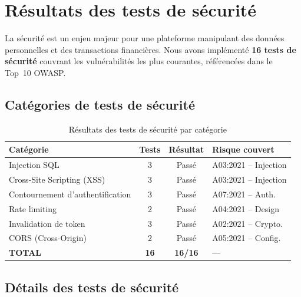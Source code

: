 \section{R\'{e}sultats des tests de s\'{e}curit\'{e}}
\label{sec:resultats-securite}

La s\'{e}curit\'{e} est un enjeu majeur pour une plateforme manipulant des
donn\'{e}es personnelles et des transactions financi\`{e}res. Nous avons
impl\'{e}ment\'{e} \textbf{16 tests de s\'{e}curit\'{e}} couvrant les vuln\'{e}rabilit\'{e}s
les plus courantes, r\'{e}f\'{e}renc\'{e}es dans le Top~10 OWASP.

\subsection{Cat\'{e}gories de tests de s\'{e}curit\'{e}}

\begin{table}[H]
\centering
\caption{R\'{e}sultats des tests de s\'{e}curit\'{e} par cat\'{e}gorie}
\label{tab:securite-resultats}
\begin{tabularx}{\textwidth}{|X|c|c|l|}
\hline
\rowcolor{speedlineBlue!10}
\textbf{Cat\'{e}gorie} & \textbf{Tests} & \textbf{R\'{e}sultat} & \textbf{Risque couvert} \\
\hline
Injection SQL & 3 & \textcolor{speedlineGreen}{Pass\'{e}} & A03:2021 -- Injection \\
\hline
Cross-Site Scripting (XSS) & 3 & \textcolor{speedlineGreen}{Pass\'{e}} & A03:2021 -- Injection \\
\hline
Contournement d'authentification & 3 & \textcolor{speedlineGreen}{Pass\'{e}} & A07:2021 -- Auth. \\
\hline
Rate limiting & 2 & \textcolor{speedlineGreen}{Pass\'{e}} & A04:2021 -- Design \\
\hline
Invalidation de token & 3 & \textcolor{speedlineGreen}{Pass\'{e}} & A02:2021 -- Crypto. \\
\hline
CORS (Cross-Origin) & 2 & \textcolor{speedlineGreen}{Pass\'{e}} & A05:2021 -- Config. \\
\hline
\rowcolor{speedlineGreen!10}
\textbf{TOTAL} & \textbf{16} & \textbf{16/16} & --- \\
\hline
\end{tabularx}
\end{table}

\subsection{D\'{e}tails des tests de s\'{e}curit\'{e}}


